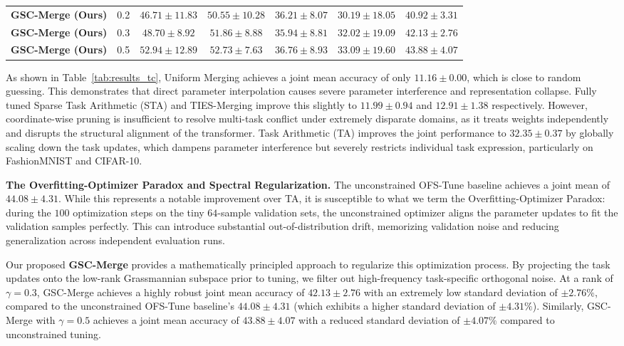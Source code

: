 \begin{table}[t]
\begin{center}
\begin{small}
\begin{sc}
\begin{tabular}{lcccccc}
\textbf{GSC-Merge (Ours)} & 0.2 & $46.71 \pm 11.83$ & $50.55 \pm 10.28$ & $36.21 \pm 8.07$ & $30.19 \pm 18.05$ & $40.92 \pm 3.31$ \\
\textbf{GSC-Merge (Ours)} & 0.3 & $48.70 \pm 8.92$ & $51.86 \pm 8.88$ & $35.94 \pm 8.81$ & $32.02 \pm 19.09$ & $42.13 \pm 2.76$ \\
\textbf{GSC-Merge (Ours)} & 0.5 & $52.94 \pm 12.89$ & $\mathbf{52.73 \pm 7.63}$ & $36.76 \pm 8.93$ & $33.09 \pm 19.60$ & $43.88 \pm 4.07$ \\
\bottomrule
\end{tabular}
\end{sc}
\end{small}
\end{center}
\vskip -0.1in
\end{table}

As shown in Table~\ref{tab:results_tc}, Uniform Merging achieves a joint mean accuracy of only $11.16 \pm 0.00$, which is close to random guessing. This demonstrates that direct parameter interpolation causes severe parameter interference and representation collapse. Fully tuned Sparse Task Arithmetic (STA) and TIES-Merging improve this slightly to $11.99 \pm 0.94$ and $12.91 \pm 1.38$ respectively. However, coordinate-wise pruning is insufficient to resolve multi-task conflict under extremely disparate domains, as it treats weights independently and disrupts the structural alignment of the transformer. Task Arithmetic (TA) improves the joint performance to $32.35 \pm 0.37$ by globally scaling down the task updates, which dampens parameter interference but severely restricts individual task expression, particularly on FashionMNIST and CIFAR-10.

\textbf{The Overfitting-Optimizer Paradox and Spectral Regularization.}
The unconstrained OFS-Tune baseline achieves a joint mean of $44.08 \pm 4.31$. While this represents a notable improvement over TA, it is susceptible to what we term the Overfitting-Optimizer Paradox: during the $100$ optimization steps on the tiny $64$-sample validation sets, the unconstrained optimizer aligns the parameter updates to fit the validation samples perfectly. This can introduce substantial out-of-distribution drift, memorizing validation noise and reducing generalization across independent evaluation runs.

Our proposed \textbf{GSC-Merge} provides a mathematically principled approach to regularize this optimization process. By projecting the task updates onto the low-rank Grassmannian subspace prior to tuning, we filter out high-frequency task-specific orthogonal noise. At a rank of $\gamma = 0.3$, GSC-Merge achieves a highly robust joint mean accuracy of \textbf{$42.13 \pm 2.76$} with an extremely low standard deviation of $\pm 2.76\%$, compared to the unconstrained OFS-Tune baseline's $44.08 \pm 4.31$ (which exhibits a higher standard deviation of $\pm 4.31\%$). Similarly, GSC-Merge with $\gamma=0.5$ achieves a joint mean accuracy of \textbf{$43.88 \pm 4.07$} with a reduced standard deviation of $\pm 4.07\%$ compared to unconstrained tuning. 

